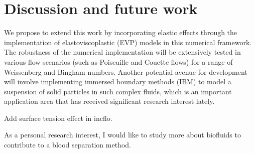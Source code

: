 \section{Discussion and future work}
We propose to extend this work by incorporating elastic effects through the implementation of elastoviscoplastic (EVP) models in this numerical framework. The robustness of the numerical implementation will be extensively tested in various flow scenarios (such as Poiseuille and Couette flows) for a range of Weissenberg and Bingham numbers.  Another potential avenue for development will involve implementing immersed boundary methods (IBM) to model a suspension of solid particles in such complex fluids, which is an important application area that has received significant research interest lately. 
\par
Add surface tension effect in incflo. 
\par 
As a personal research interest, I would like to study more about biofluids to contribute to a blood separation method. 